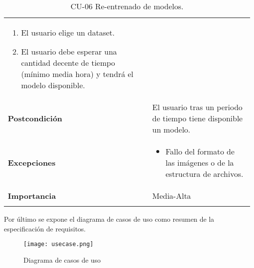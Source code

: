 \begin{longtable}[H]{@{}ll@{}}
\begin{minipage}[t]{0.68\columnwidth}
\begin{enumerate}
\def\labelenumi{\arabic{enumi}.}
\tightlist
\item
  El usuario elige un dataset.
\item
  El usuario debe esperar una cantidad decente de tiempo (mínimo media hora) y tendrá el modelo disponible.
\end{enumerate}\strut
\end{minipage}\tabularnewline
\begin{minipage}[t]{0.26\columnwidth}\raggedright\strut
\textbf{Postcondición}\strut
\end{minipage} & \begin{minipage}[t]{0.68\columnwidth}\raggedright\strut%
El usuario tras un periodo de tiempo tiene disponible un modelo.\strut
\end{minipage}\tabularnewline
\begin{minipage}[t]{0.26\columnwidth}\raggedright\strut
\textbf{Excepciones}\strut
\end{minipage} & \begin{minipage}[t]{0.68\columnwidth}\raggedright\strut%
\begin{itemize}
\tightlist
\item
  Fallo del formato de las imágenes o de la estructura de archivos.
\end{itemize}\strut
\end{minipage}\tabularnewline
\begin{minipage}[t]{0.26\columnwidth}\raggedright\strut
\textbf{Importancia}\strut
\end{minipage} & \begin{minipage}[t]{0.68\columnwidth}\raggedright\strut%
Media-Alta\strut
\end{minipage}\tabularnewline
\bottomrule%
\caption{CU-06 Re-entrenado de modelos.}
\end{longtable}

\newpage
Por último se expone el diagrama de casos de uso como resumen de la especificación de requisitos.

\begin{figure}
	\centering
	\texttt{[image: usecase.png]}
	\caption{Diagrama de casos de uso}\label{fig:usecase.png}
\end{figure}


